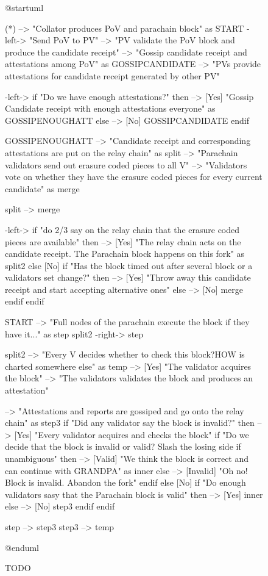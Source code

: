 \documentclass{book}
\begin{document}
\begin{figure}[h!]
\begin{plantuml}
@startuml

(*) --> "Collator produces PoV and parachain block" as START
-left-> "Send PoV to PV"
--> "PV validate the PoV block and produce the candidate receipt"
--> "Gossip candidate receipt and attestations among PoV" as GOSSIPCANDIDATE
--> "PVs provide attestations for candidate receipt generated by other PV"

-left-> if "Do we have enough attestations?" then
    --> [Yes] "Gossip Candidate receipt with enough attestations everyone" as GOSSIPENOUGHATT
else
    --> [No] GOSSIPCANDIDATE
endif

GOSSIPENOUGHATT --> "Candidate receipt and corresponding attestations are put on the relay chain" as split
--> "Parachain validators send out erasure coded pieces to all V"
--> "Validators vote on whether they have the erasure coded pieces for every current candidate" as merge

split --> merge

-left-> if "do 2/3 say on the relay chain that the erasure coded pieces are available" then
    --> [Yes] "The relay chain acts on the candidate receipt. The Parachain block happens on this fork" as split2
else
    [No] if "Has the block timed out after several block or a validators set change?" then
        --> [Yes] "Throw away this candidate receipt and start accepting alternative ones"
    else
        --> [No] merge
    endif
endif

START --> "Full nodes of the parachain execute the block if they have it..." as step
split2 -right-> step

split2 --> "Every V decides whether to check this block?HOW is charted somewhere else" as temp
--> [Yes] "The validator acquires the block"
--> "The validators validates the block and produces an attestation"

--> "Attestations and reports are gossiped and go onto the relay chain" as step3
if "Did any validator say the block is invalid?" then
    --> [Yes] "Every validator acquires and checks the block"
    if "Do we decide that the block is invalid or valid? Slash the losing side if unambiguous" then
        --> [Valid] "We think the block is correct and can continue with GRANDPA" as inner
    else
        --> [Invalid] "Oh no! Block is invalid. Abandon the fork"
    endif
else
    [No] if "Do enough validators sasy that the Parachain block is valid" then
        --> [Yes] inner
    else
        --> [No] step3
    endif
endif

step --> step3
step3 --> temp

@enduml
\end{plantuml}
\caption{TODO}
\end{figure}
\end{document}
